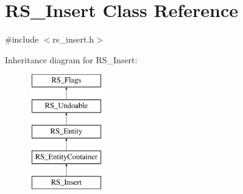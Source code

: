 \hypertarget{classRS__Insert}{\section{R\-S\-\_\-\-Insert Class Reference}
\label{classRS__Insert}
}


{\ttfamily \#include $<$rs\-\_\-insert.\-h$>$}

Inheritance diagram for R\-S\-\_\-\-Insert\-:\begin{figure}[H]
\begin{center}
\leavevmode
\includegraphics[height=5.000000cm]{classRS__Insert}
\end{center}
\end{figure}
